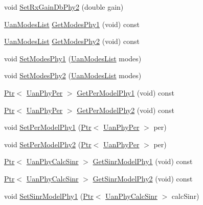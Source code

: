 \begin{DoxyCompactItemize}
void \hyperlink{classns3_1_1UanPhyDual_a921b74b5ae9ac88b57a514bae23d8685}{Set\+Rx\+Gain\+Db\+Phy2} (double gain)
\item 
\hyperlink{classns3_1_1UanModesList}{Uan\+Modes\+List} \hyperlink{classns3_1_1UanPhyDual_ac4636feefd74c30695371d7ac373fd85}{Get\+Modes\+Phy1} (void) const 
\item 
\hyperlink{classns3_1_1UanModesList}{Uan\+Modes\+List} \hyperlink{classns3_1_1UanPhyDual_a9447bc831437db5046075ec22b1ec2b6}{Get\+Modes\+Phy2} (void) const 
\item 
void \hyperlink{classns3_1_1UanPhyDual_a86ff19d361148fa1cfd23d80d8e06fb6}{Set\+Modes\+Phy1} (\hyperlink{classns3_1_1UanModesList}{Uan\+Modes\+List} modes)
\item 
void \hyperlink{classns3_1_1UanPhyDual_a411f74a7c5da6aa8603a914c25056148}{Set\+Modes\+Phy2} (\hyperlink{classns3_1_1UanModesList}{Uan\+Modes\+List} modes)
\item 
\hyperlink{classns3_1_1Ptr}{Ptr}$<$ \hyperlink{classns3_1_1UanPhyPer}{Uan\+Phy\+Per} $>$ \hyperlink{classns3_1_1UanPhyDual_abf21e856a7f9fa3f1aff5e5e2964c8d3}{Get\+Per\+Model\+Phy1} (void) const 
\item 
\hyperlink{classns3_1_1Ptr}{Ptr}$<$ \hyperlink{classns3_1_1UanPhyPer}{Uan\+Phy\+Per} $>$ \hyperlink{classns3_1_1UanPhyDual_a69fa7ff8b092615772f94f5d2ea15258}{Get\+Per\+Model\+Phy2} (void) const 
\item 
void \hyperlink{classns3_1_1UanPhyDual_a32127bf586c927b2c7bc8a0f6883596d}{Set\+Per\+Model\+Phy1} (\hyperlink{classns3_1_1Ptr}{Ptr}$<$ \hyperlink{classns3_1_1UanPhyPer}{Uan\+Phy\+Per} $>$ per)
\item 
void \hyperlink{classns3_1_1UanPhyDual_a7437d8ef31a521ae4763ff7906c3cf1a}{Set\+Per\+Model\+Phy2} (\hyperlink{classns3_1_1Ptr}{Ptr}$<$ \hyperlink{classns3_1_1UanPhyPer}{Uan\+Phy\+Per} $>$ per)
\item 
\hyperlink{classns3_1_1Ptr}{Ptr}$<$ \hyperlink{classns3_1_1UanPhyCalcSinr}{Uan\+Phy\+Calc\+Sinr} $>$ \hyperlink{classns3_1_1UanPhyDual_a6be547eee609c38cc68013bcbae4609e}{Get\+Sinr\+Model\+Phy1} (void) const 
\item 
\hyperlink{classns3_1_1Ptr}{Ptr}$<$ \hyperlink{classns3_1_1UanPhyCalcSinr}{Uan\+Phy\+Calc\+Sinr} $>$ \hyperlink{classns3_1_1UanPhyDual_a9494e05c0bd985c47788dce81f256e41}{Get\+Sinr\+Model\+Phy2} (void) const 
\item 
void \hyperlink{classns3_1_1UanPhyDual_ae88698bf1f37d31084bc7ba089cc4d79}{Set\+Sinr\+Model\+Phy1} (\hyperlink{classns3_1_1Ptr}{Ptr}$<$ \hyperlink{classns3_1_1UanPhyCalcSinr}{Uan\+Phy\+Calc\+Sinr} $>$ calc\+Sinr)

\end{DoxyCompactItemize}
